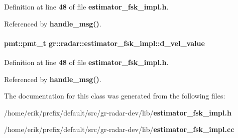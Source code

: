 Definition at line {\bf 48} of file {\bf estimator\+\_\+fsk\+\_\+impl.\+h}.



Referenced by {\bf handle\+\_\+msg()}.

\paragraph[{d\+\_\+vel\+\_\+value}]{\setlength{\rightskip}{0pt plus 5cm}pmt\+::pmt\+\_\+t gr\+::radar\+::estimator\+\_\+fsk\+\_\+impl\+::d\+\_\+vel\+\_\+value}\label{classgr_1_1radar_1_1estimator__fsk__impl_aa7433aa92683a21fb68039481f6224c9}


Definition at line {\bf 48} of file {\bf estimator\+\_\+fsk\+\_\+impl.\+h}.



Referenced by {\bf handle\+\_\+msg()}.



The documentation for this class was generated from the following files\+:\begin{DoxyCompactItemize}
\item 
/home/erik/prefix/default/src/gr-\/radar-\/dev/lib/{\bf estimator\+\_\+fsk\+\_\+impl.\+h}\item 
/home/erik/prefix/default/src/gr-\/radar-\/dev/lib/{\bf estimator\+\_\+fsk\+\_\+impl.\+cc}\end{DoxyCompactItemize}
